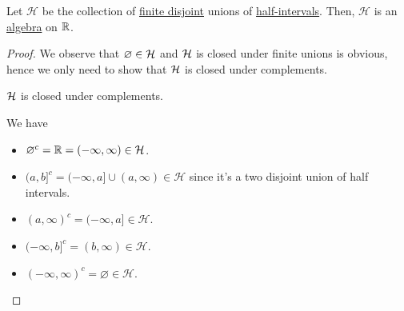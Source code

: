 \begin{lemma}
	Let \(\mathcal{H} \) be the collection of \underline{finite disjoint} unions of \hyperref[def:half-intervals]{half-intervals}. Then, \(\mathcal{H} \)
	is an \hyperref[def:algebra]{algebra} on \(\mathbb{\MakeUppercase{R}} \).
\end{lemma}
\begin{proof}
	We observe that \(\varnothing \in \mathcal{\MakeUppercase{h}} \) and \(\mathcal{\MakeUppercase{h}} \) is closed under finite unions is obvious, hence
	we only need to show that \(\mathcal{\MakeUppercase{h}} \) is closed under complements.
	\begin{claim}
		\(\mathcal{\MakeUppercase{h}} \) is closed under complements.
	\end{claim}
	\begin{explanation}
		We have
		\begin{itemize}
			\item \(\varnothing ^{c} = \mathbb{\MakeUppercase{r}} = (-\infty , \infty )\in \mathcal{H}\).
			\item \((a, b]^{c} = (-\infty , a] \cup (a, \infty )\in\mathcal{H} \) since it's a two disjoint union of half intervals.
			\item \((a, \infty )^{c} = (-\infty , a]\in\mathcal{H}\).
			\item \((-\infty , b]^{c} = (b, \infty )\in\mathcal{H} \).
			\item \((-\infty , \infty )^{c} = \varnothing \in\mathcal{H}\).
		\end{itemize}
	\end{explanation}
\end{proof}

